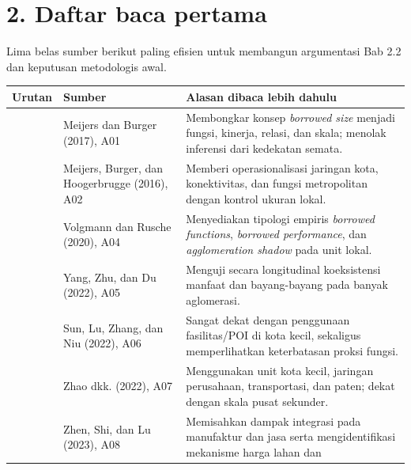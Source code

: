 \documentclass[
  indonesian,
  11pt,
  a4paper,
  oneside,
  openany]{report}
\newcounter{none} %
\begin{document}
\section{2. Daftar baca pertama}\label{daftar-baca-pertama}

Lima belas sumber berikut paling efisien untuk membangun argumentasi Bab
2.2 dan keputusan metodologis awal.

{\def\LTcaptype{none} %
\begin{longtable}[]{@{}
  >{\centering\arraybackslash}p{}
  >{\raggedright\arraybackslash}p{}
  >{\raggedright\arraybackslash}p{}@{}}
\toprule\noalign{}
\begin{minipage}[b]{\linewidth}\raggedleft
Urutan
\end{minipage} & \begin{minipage}[b]{\linewidth}\raggedright
Sumber
\end{minipage} & \begin{minipage}[b]{\linewidth}\raggedright
Alasan dibaca lebih dahulu
\end{minipage} \\
\midrule\noalign{}
\endhead
\bottomrule\noalign{}
\endlastfoot
1 & Meijers dan Burger (2017), A01 & Membongkar konsep \emph{borrowed
size} menjadi fungsi, kinerja, relasi, dan skala; menolak inferensi dari
kedekatan semata. \\
2 & Meijers, Burger, dan Hoogerbrugge (2016), A02 & Memberi
operasionalisasi jaringan kota, konektivitas, dan fungsi metropolitan
dengan kontrol ukuran lokal. \\
3 & Volgmann dan Rusche (2020), A04 & Menyediakan tipologi empiris
\emph{borrowed functions}, \emph{borrowed performance}, dan
\emph{agglomeration shadow} pada unit lokal. \\
4 & Yang, Zhu, dan Du (2022), A05 & Menguji secara longitudinal
koeksistensi manfaat dan bayang-bayang pada banyak aglomerasi. \\
5 & Sun, Lu, Zhang, dan Niu (2022), A06 & Sangat dekat dengan penggunaan
fasilitas/POI di kota kecil, sekaligus memperlihatkan keterbatasan
proksi fungsi. \\
6 & Zhao dkk. (2022), A07 & Menggunakan unit kota kecil, jaringan
perusahaan, transportasi, dan paten; dekat dengan skala pusat
sekunder. \\
7 & Zhen, Shi, dan Lu (2023), A08 & Memisahkan dampak integrasi pada
manufaktur dan jasa serta mengidentifikasi mekanisme harga lahan dan

\end{longtable}}
\end{document}
